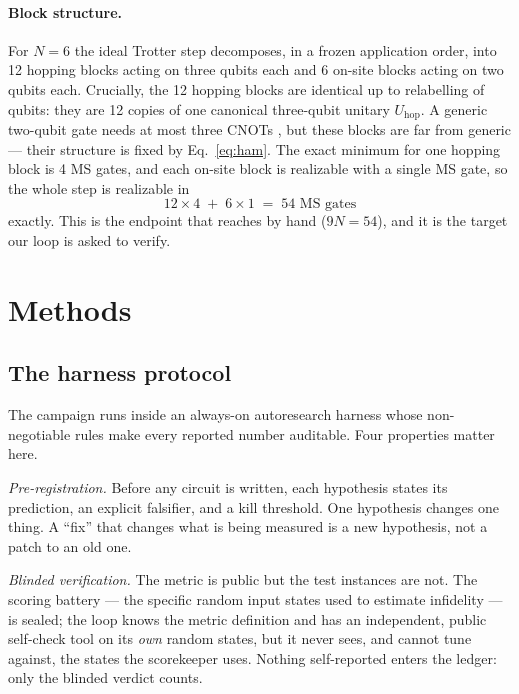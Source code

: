 \documentclass[11pt]{article}
\begin{document}
\paragraph{Block structure.} For $N=6$ the ideal Trotter step decomposes, in a
frozen application order, into 12 hopping blocks acting on three qubits each and 6
on-site blocks acting on two qubits each. Crucially, the 12 hopping blocks are
identical up to relabelling of qubits: they are 12 copies of one canonical
three-qubit unitary $U_{\mathrm{hop}}$. A generic two-qubit gate needs at most three
CNOTs \cite{Vidal2004,Vatan2004}, but these blocks are far from generic --- their
structure is fixed by Eq.~\eqref{eq:ham}. The exact minimum for one hopping block is
4 MS gates, and each on-site block is realizable with a single MS gate, so the whole
step is realizable in
\begin{equation}
12 \times 4 \;+\; 6 \times 1 \;=\; 54 \text{ MS gates}
\label{eq:count}
\end{equation}
exactly. This is the endpoint that \cite{Srinivasan2024} reaches by hand
($9N = 54$), and it is the target our loop is asked to verify.

\section{Methods}
\label{sec:methods}

\subsection{The harness protocol}

The campaign runs inside an always-on autoresearch harness whose non-negotiable
rules make every reported number auditable. Four properties matter here.

\emph{Pre-registration.} Before any circuit is written, each hypothesis states its
prediction, an explicit falsifier, and a kill threshold. One hypothesis changes one
thing. A ``fix'' that changes what is being measured is a new hypothesis, not a
patch to an old one.

\emph{Blinded verification.} The metric is public but the test instances are not.
The scoring battery --- the specific random input states used to estimate infidelity
--- is sealed; the loop knows the metric definition and has an independent, public
self-check tool on its \emph{own} random states, but it never sees, and cannot tune
against, the states the scorekeeper uses. Nothing self-reported enters the ledger:
only the blinded verdict counts.
\end{document}
